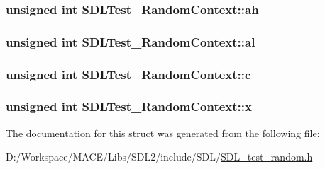 \subsubsection[{\texorpdfstring{ah}{ah}}]{\setlength{\rightskip}{0pt plus 5cm}unsigned {\bf int} S\+D\+L\+Test\+\_\+\+Random\+Context\+::ah}\hypertarget{struct_s_d_l_test___random_context_a2c8d2f1ee16cdfd38361b8f03b3fdb85}{}\label{struct_s_d_l_test___random_context_a2c8d2f1ee16cdfd38361b8f03b3fdb85}
\subsubsection[{\texorpdfstring{al}{al}}]{\setlength{\rightskip}{0pt plus 5cm}unsigned {\bf int} S\+D\+L\+Test\+\_\+\+Random\+Context\+::al}\hypertarget{struct_s_d_l_test___random_context_a0e2bccd3611d383d6510c6c828aa54c4}{}\label{struct_s_d_l_test___random_context_a0e2bccd3611d383d6510c6c828aa54c4}
\subsubsection[{\texorpdfstring{c}{c}}]{\setlength{\rightskip}{0pt plus 5cm}unsigned {\bf int} S\+D\+L\+Test\+\_\+\+Random\+Context\+::c}\hypertarget{struct_s_d_l_test___random_context_a17a6a7e7b68a33c67d9b74c8c7c33198}{}\label{struct_s_d_l_test___random_context_a17a6a7e7b68a33c67d9b74c8c7c33198}
\subsubsection[{\texorpdfstring{x}{x}}]{\setlength{\rightskip}{0pt plus 5cm}unsigned {\bf int} S\+D\+L\+Test\+\_\+\+Random\+Context\+::x}\hypertarget{struct_s_d_l_test___random_context_a8bd6d1b4e1677ed1c06f5cc09f1af5b6}{}\label{struct_s_d_l_test___random_context_a8bd6d1b4e1677ed1c06f5cc09f1af5b6}


The documentation for this struct was generated from the following file\+:\begin{DoxyCompactItemize}
\item 
D\+:/\+Workspace/\+M\+A\+C\+E/\+Libs/\+S\+D\+L2/include/\+S\+D\+L/\hyperlink{_s_d_l__test__random_8h}{S\+D\+L\+\_\+test\+\_\+random.\+h}\end{DoxyCompactItemize}
